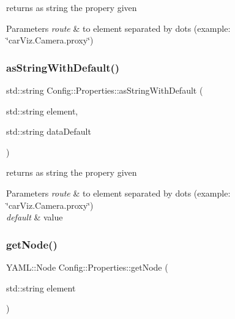 returns as string the propery given 


\begin{DoxyParams}{Parameters}
{\em route} & to element separated by dots (example\+: \char`\"{}car\+Viz.\+Camera.\+proxy\char`\"{}) \\
\hline
\end{DoxyParams}
\mbox{\label{class_config_1_1_properties_a38019252713b2a815b78eab3a4e00e75}} 
\subsubsection{\texorpdfstring{as\+String\+With\+Default()}{asStringWithDefault()}}
{\footnotesize\ttfamily std\+::string Config\+::\+Properties\+::as\+String\+With\+Default (\begin{DoxyParamCaption}\item[{std\+::string}]{element,  }\item[{std\+::string}]{data\+Default }\end{DoxyParamCaption})}



returns as string the propery given 


\begin{DoxyParams}{Parameters}
{\em route} & to element separated by dots (example\+: \char`\"{}car\+Viz.\+Camera.\+proxy\char`\"{}) \\
\hline
{\em default} & value \\
\hline
\end{DoxyParams}
\mbox{\label{class_config_1_1_properties_abb18930b0431bd89e85ed0a5b9b7cac3}} 
\subsubsection{\texorpdfstring{get\+Node()}{getNode()}\hspace{0.1cm}{\footnotesize\ttfamily [1/2]}}
{\footnotesize\ttfamily Y\+A\+M\+L\+::\+Node Config\+::\+Properties\+::get\+Node (\begin{DoxyParamCaption}\item[{std\+::string}]{element }\end{DoxyParamCaption})}

